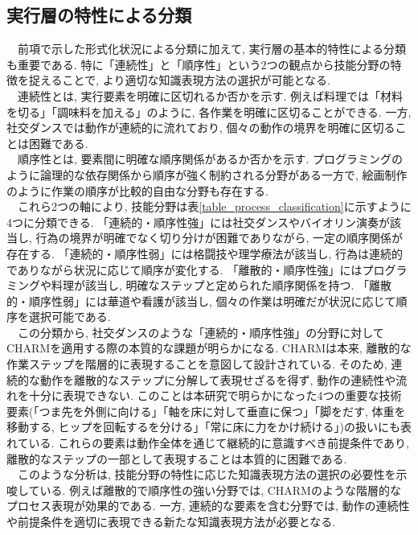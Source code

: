 \subsection{実行層の特性による分類}
　前項で示した形式化状況による分類に加えて, 実行層の基本的特性による分類も重要である. 特に「連続性」と「順序性」という2つの観点から技能分野の特徴を捉えることで, より適切な知識表現方法の選択が可能となる. \\
　連続性とは, 実行要素を明確に区切れるか否かを示す. 例えば料理では「材料を切る」「調味料を加える」のように, 各作業を明確に区切ることができる. 一方, 社交ダンスでは動作が連続的に流れており, 個々の動作の境界を明確に区切ることは困難である. \\
　順序性とは, 要素間に明確な順序関係があるか否かを示す. プログラミングのように論理的な依存関係から順序が強く制約される分野がある一方で, 絵画制作のように作業の順序が比較的自由な分野も存在する. \\
　これら2つの軸により, 技能分野は表\ref{table_process_classification}に示すように4つに分類できる. 「連続的・順序性強」には社交ダンスやバイオリン演奏が該当し, 行為の境界が明確でなく切り分けが困難でありながら, 一定の順序関係が存在する. 「連続的・順序性弱」には格闘技や理学療法が該当し, 行為は連続的でありながら状況に応じて順序が変化する. 「離散的・順序性強」にはプログラミングや料理が該当し, 明確なステップと定められた順序関係を持つ. 「離散的・順序性弱」には華道や看護が該当し, 個々の作業は明確だが状況に応じて順序を選択可能である. \\
　この分類から, 社交ダンスのような「連続的・順序性強」の分野に対してCHARMを適用する際の本質的な課題が明らかになる. CHARMは本来, 離散的な作業ステップを階層的に表現することを意図して設計されている. そのため, 連続的な動作を離散的なステップに分解して表現せざるを得ず, 動作の連続性や流れを十分に表現できない. このことは本研究で明らかになった4つの重要な技術要素(「つま先を外側に向ける」「軸を床に対して垂直に保つ」「脚をだす, 体重を移動する, ヒップを回転するを分ける」「常に床に力をかけ続ける」)の扱いにも表れている. これらの要素は動作全体を通じて継続的に意識すべき前提条件であり, 離散的なステップの一部として表現することは本質的に困難である. \\
　このような分析は, 技能分野の特性に応じた知識表現方法の選択の必要性を示唆している. 例えば離散的で順序性の強い分野では, CHARMのような階層的なプロセス表現が効果的である. 一方, 連続的な要素を含む分野では, 動作の連続性や前提条件を適切に表現できる新たな知識表現方法が必要となる. \\

